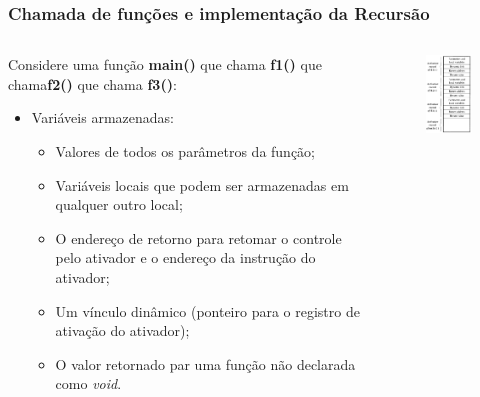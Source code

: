\documentclass[10pt, handout]{beamer}
\begin{document}
\begin{frame}
  \frametitle{Chamada de funções e implementação da Recursão}
  \begin{columns}[t]
    \begin{column}{6cm}
      Considere uma função \textbf{main()} que chama \textbf{f1()} que chama\textbf{f2()} que chama \textbf{f3()}:
      \begin{itemize}
        \item Variáveis armazenadas:
              \begin{itemize}
                \item Valores de todos os parâmetros da função;
                \item Variáveis locais que podem ser armazenadas em qualquer outro local;
                \item O endereço de retorno para retomar o controle pelo ativador e o endereço da instrução do ativador;
                \item Um vínculo dinâmico (ponteiro para o registro de ativação do ativador);
                \item O valor retornado par uma função não declarada como \emph{void}.
              \end{itemize}
      \end{itemize}
    \end{column}
    \begin{column}{6cm}
      \begin{figure}[h]
        \begin{center}
          \includegraphics[width=4cm]{fig/img05}
        \end{center}
      \end{figure}
    \end{column}
  \end{columns}
\end{frame}
\end{document}
